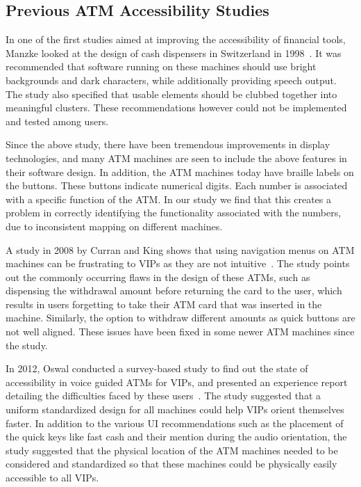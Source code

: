 \subsection{Previous ATM Accessibility Studies}
\label{ssec:previousatmstudies}

In one of the first studies aimed at improving the accessibility of financial tools, Manzke looked at the design of cash dispensers in Switzerland in 1998~\cite{manzke1998adaptation}. It was recommended that software running on these machines should use bright backgrounds and dark characters, while additionally providing speech output. The study also specified that usable elements should be clubbed together into meaningful clusters. These recommendations however could not be implemented and tested among users.  

Since the above study, there have been tremendous improvements in display technologies, and many ATM machines are seen to include the above features in their software design. In addition, the ATM machines today have braille labels on the buttons. These buttons indicate numerical digits. Each number is associated with a specific function of the ATM. In our study we find that this creates a problem in correctly identifying the functionality associated with the numbers, due to inconsistent mapping on different machines.

A study in 2008 by Curran and King shows that using navigation menus on ATM machines can be frustrating to VIPs as they are not intuitive~\cite{curran2008investigating}. The study points out the commonly occurring flaws in the design of these ATMs, such as dispensing the withdrawal amount before returning the card to the user, which results in users forgetting to take their ATM card that was inserted in the machine. Similarly, the option to withdraw different amounts as quick buttons are not well aligned. These issues have been fixed in some newer ATM machines since the study.  

In 2012, Oswal conducted a survey-based study to find out the state of accessibility in voice guided ATMs for VIPs, and presented an experience report detailing the difficulties faced by these users~\cite{oswal2012accessible}. The study suggested that a uniform standardized design for all machines could help VIPs orient themselves faster. In addition to the various UI recommendations such as the placement of the quick keys like fast cash and their mention during the audio orientation, the study suggested that the physical location of the ATM machines needed to be considered and standardized so that these machines could be physically easily accessible to all VIPs.

